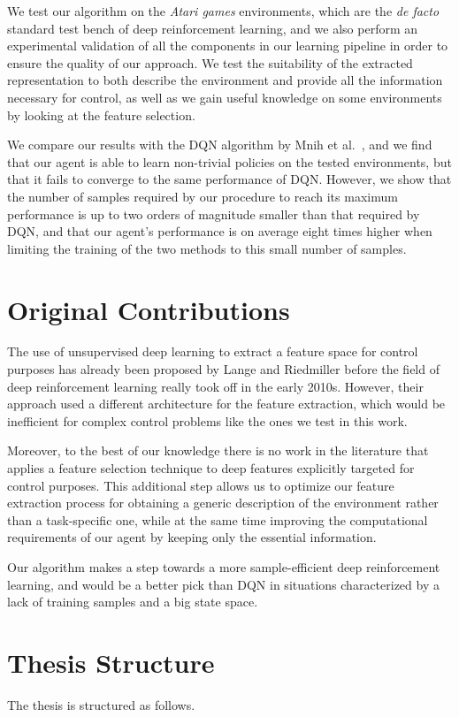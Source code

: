 We test our algorithm on the \textit{Atari games} environments, which are
the \textit{de facto} standard test bench of deep reinforcement learning, and we 
also perform an experimental validation of all the components in our learning 
pipeline in order to ensure the quality of our approach.
We test the suitability of the extracted representation to both describe the 
environment and provide all the information necessary for control, as well as 
we gain useful knowledge on some environments by looking at the feature 
selection.

We compare our results with the DQN algorithm by Mnih et al.\ \cite{mnih2015human},
and we find that our agent is able to learn non-trivial policies on the tested 
environments, but that it fails to converge to the same performance of DQN. 
However, we show that the number of samples required by our procedure to reach 
its maximum performance is up to two orders of magnitude smaller than that 
required by DQN, and that our agent's performance is on average eight times 
higher when limiting the training of the two methods to this small number of 
samples.

\section{Original Contributions}
The use of unsupervised deep learning to extract a feature space for control 
purposes has already been proposed by Lange and Riedmiller \cite{lange2010deep} 
before the field of deep reinforcement learning really took off in the early 
2010s. 
However, their approach used a different architecture for the feature extraction, 
which would be inefficient for complex control problems like the ones we test
in this work. 

Moreover, to the best of our knowledge there is no work in the literature that
applies a feature selection technique to deep features explicitly targeted 
for control purposes. 
This additional step allows us to optimize our feature extraction process for 
obtaining a generic description of the environment rather than a task-specific 
one, while at the same time improving the computational requirements of our 
agent by keeping only the essential information. 

Our algorithm makes a step towards a more sample-efficient deep reinforcement 
learning, and would be a better pick than DQN in situations characterized by a 
lack of training samples and a big state space. 

\section{Thesis Structure}
The thesis is structured as follows. 

